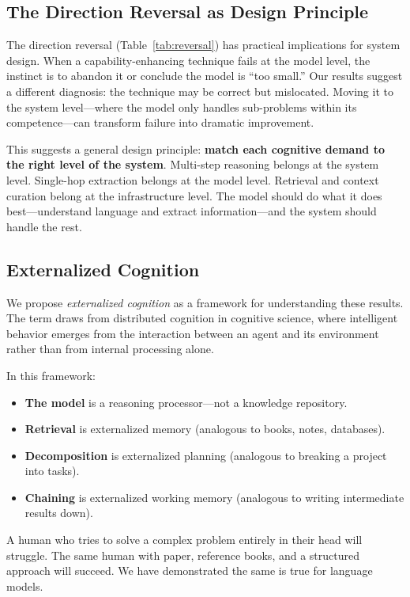\documentclass[11pt]{article}
\begin{document}
\subsection{The Direction Reversal as Design Principle}

The direction reversal (Table~\ref{tab:reversal}) has practical implications for system design. When a capability-enhancing technique fails at the model level, the instinct is to abandon it or conclude the model is ``too small.'' Our results suggest a different diagnosis: the technique may be correct but mislocated. Moving it to the system level---where the model only handles sub-problems within its competence---can transform failure into dramatic improvement.

This suggests a general design principle: \textbf{match each cognitive demand to the right level of the system}. Multi-step reasoning belongs at the system level. Single-hop extraction belongs at the model level. Retrieval and context curation belong at the infrastructure level. The model should do what it does best---understand language and extract information---and the system should handle the rest.

\subsection{Externalized Cognition}

We propose \emph{externalized cognition} as a framework for understanding these results. The term draws from distributed cognition in cognitive science, where intelligent behavior emerges from the interaction between an agent and its environment rather than from internal processing alone.

In this framework:
\begin{itemize}[nosep]
    \item \textbf{The model} is a reasoning processor---not a knowledge repository.
    \item \textbf{Retrieval} is externalized memory (analogous to books, notes, databases).
    \item \textbf{Decomposition} is externalized planning (analogous to breaking a project into tasks).
    \item \textbf{Chaining} is externalized working memory (analogous to writing intermediate results down).
\end{itemize}

A human who tries to solve a complex problem entirely in their head will struggle. The same human with paper, reference books, and a structured approach will succeed. We have demonstrated the same is true for language models.
\end{document}
